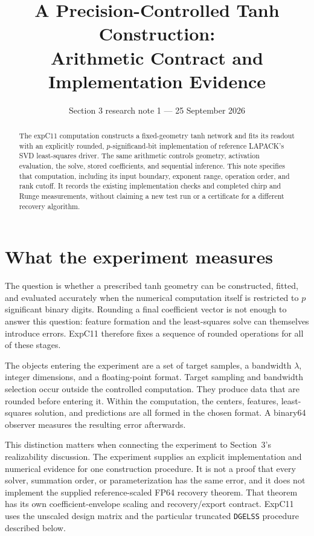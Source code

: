 \documentclass[11pt]{article}
\title{A Precision-Controlled Tanh Construction:\\Arithmetic Contract and Implementation Evidence}
\author{}\date{Section 3 research note 1 --- 25 September 2026}
\newcommand{\code}[1]{\texttt{#1}}
\begin{document}
\maketitle

\begin{abstract}
The expC11 computation constructs a fixed-geometry tanh network and fits its
readout with an explicitly rounded, $p$-significand-bit implementation of
reference LAPACK's SVD least-squares driver. The same arithmetic controls
geometry, activation evaluation, the solve, stored coefficients, and sequential
inference. This note specifies that computation, including its input boundary,
exponent range, operation order, and rank cutoff. It records the existing
implementation checks and completed chirp and Runge measurements, without
claiming a new test run or a certificate for a different recovery algorithm.
\end{abstract}

\section{What the experiment measures}

The question is whether a prescribed tanh geometry can be constructed, fitted,
and evaluated accurately when the numerical computation itself is restricted
to $p$ significant binary digits. Rounding a final coefficient vector is not
enough to answer this question: feature formation and the least-squares solve
can themselves introduce errors. ExpC11 therefore fixes a sequence of rounded
operations for all of these stages.

The objects entering the experiment are a set of target samples, a bandwidth
$\lambda$, integer dimensions, and a floating-point format. Target sampling
and bandwidth selection occur outside the controlled computation. They produce
data that are rounded before entering it. Within the computation, the centers,
features, least-squares solution, and predictions are all formed in the chosen
format. A binary64 observer measures the resulting error afterwards.

This distinction matters when connecting the experiment to Section~3's
realizability discussion. The experiment supplies an explicit implementation
and numerical evidence for one construction procedure. It is not a proof that
every solver, summation order, or parameterization has the same error, and it
does not implement the supplied reference-scaled FP64 recovery theorem. That
theorem has its own coefficient-envelope scaling and recovery/export contract.
ExpC11 uses the unscaled design matrix and the particular truncated
\code{DGELSS} procedure described below.
\end{document}
